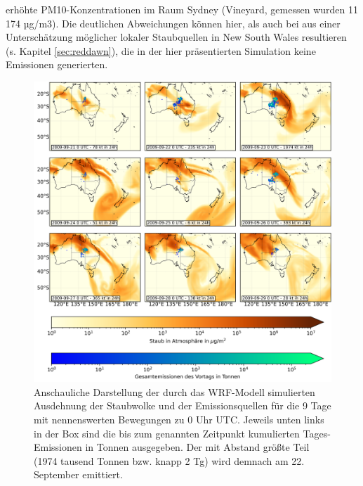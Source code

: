 \documentclass[12pt,a4paper,onecolumn]{scrartcl}
\begin{document}
erhöhte PM10-Konzentrationen im Raum Sydney (Vineyard, gemessen wurden 11 174 µg/m3). Die deutlichen Abweichungen können hier, als auch bei \citet{AlizadehChoobari.2012} aus einer Unterschätzung möglicher lokaler Staubquellen in New South Wales resultieren (s. Kapitel \ref{sec:reddawn}), die in der hier präsentierten Simulation keine Emissionen generierten.
\begin{figure}[!htb]
\includegraphics[width=\textwidth]{bilder/dustload.png}
\caption{Anschauliche Darstellung der durch das WRF-Modell simulierten Ausdehnung der Staubwolke und der Emissionsquellen für die 9 Tage mit nennenswerten Bewegungen zu 0 Uhr UTC. Jeweils unten links in der Box sind die bis zum genannten Zeitpunkt kumulierten Tages-Emissionen in Tonnen ausgegeben. Der mit Abstand größte Teil (1974 tausend Tonnen bzw. knapp 2 Tg) wird demnach am 22. September emittiert. } \label{fig:dustload}
\end{figure}
\end{document}
